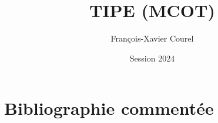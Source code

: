 \documentclass[a4paper]{article}
\title{TIPE (MCOT)}
\author{François-Xavier Courel}
\date{Session 2024}
\begin{document}
\maketitle

\section*{Bibliographie commentée}
\end{document}
